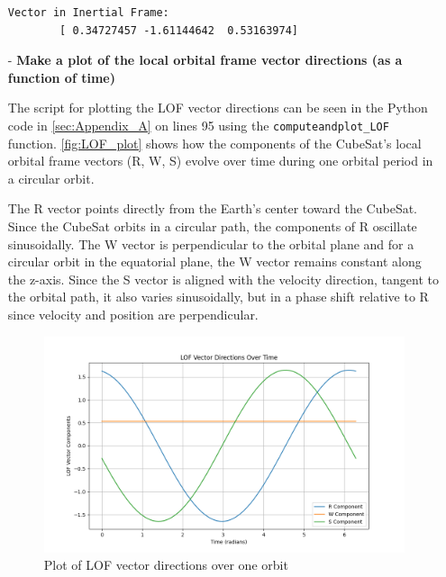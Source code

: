 \begin{itemize}
\begin{lstlisting}[frame=single]
        Vector in Inertial Frame:
        [ 0.34727457 -1.61144642  0.53163974]
    \end{lstlisting}
    
    \item[-] \textbf{Make a plot of the local orbital frame vector directions (as a function of time)}

    The script for plotting the LOF vector directions can be seen in the Python code in \autoref{sec:Appendix_A} on lines 95 using the \verb|computeandplot_LOF| function.
    \autoref{fig:LOF_plot} shows how the components of the CubeSat's local orbital frame vectors (R, W, S) evolve over time during one orbital period in a circular orbit.

    The R vector points directly from the Earth’s center toward the CubeSat.
    Since the CubeSat orbits in a circular path, the components of R oscillate sinusoidally.     
    The W vector is perpendicular to the orbital plane and for a circular orbit in the equatorial plane, the W vector remains constant along the z-axis.    
    Since the S vector is aligned with the velocity direction, tangent to the orbital path, it also varies sinusoidally, but in a phase shift relative to R since velocity and position are perpendicular.

    \begin{figure}[h]
        \centering
        \includegraphics[width=\linewidth]{Doc/Graphics/LOF_vector_directions_plot.png}
        \caption{Plot of LOF vector directions over one orbit}
        \label{fig:LOF_plot}
    \end{figure}
\end{itemize}